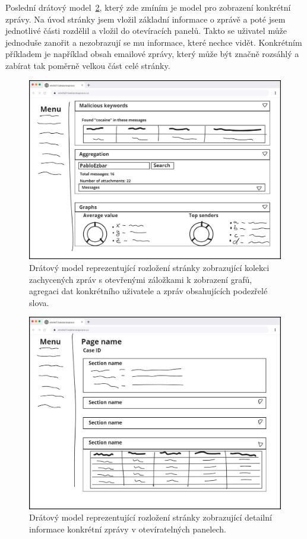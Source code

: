         Poslední drátový model~\ref{fig:wireframeDetailPage}, který zde zmíním je model pro zobrazení konkrétní zprávy. Na úvod stránky jsem vložil základní informace o zprávě a poté jsem jednotlivé části rozdělil a vložil do otevíracích panelů. Takto se uživatel může jednoduše zanořit a nezobrazují se mu informace, které nechce vidět. Konkrétním příkladem je například obsah emailové zprávy, který může být značně rozsáhlý a zabírat tak poměrně velkou část celé stránky.
        
    \begin{figure}[H]
        \centering
        \includegraphics[scale=0.3]{obrazky-figures/NavrhUXUI/ListPageDetail.jpg}
        \caption{Drátový model reprezentující rozložení stránky zobrazující kolekci zachycených zpráv s otevřenými záložkami k zobrazení grafů, agregaci dat konkrétního uživatele a zpráv obsahujících podezřelé slova.}
        \label{fig:wireframeListPagePanels}
    \end{figure}


    
    \begin{figure}[H]
        \centering
        \includegraphics[scale=0.3]{obrazky-figures/NavrhUXUI/DetailPage.jpg}
        \caption{Drátový model reprezentující rozložení stránky zobrazující detailní informace konkrétní zprávy v otevíratelných panelech.}
        \label{fig:wireframeDetailPage}
    \end{figure}
    
